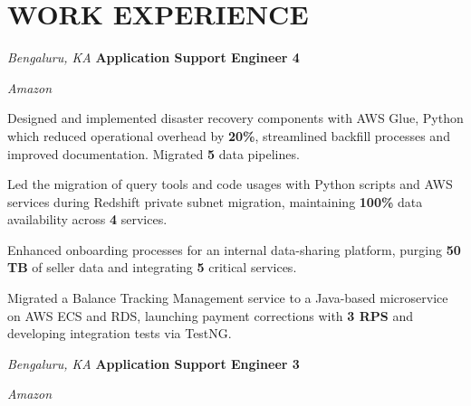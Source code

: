 \section{WORK EXPERIENCE}

\begin{twocolentry}{
    \textit{Bengaluru, KA}}
    \textbf{Application Support Engineer 4}
    
    \textit{Amazon}
\end{twocolentry}

\vspace{0.15 cm}

\begin{onecolentry}
    \begin{highlights}
        \item Designed and implemented disaster recovery components with AWS Glue, Python which reduced operational overhead by \textbf{20\%}, streamlined backfill processes and improved documentation. Migrated \textbf{5} data pipelines.
        \item Led the migration of query tools and code usages with Python scripts and AWS services during Redshift private subnet migration, maintaining \textbf{100\%} data availability across \textbf{4} services.
        \item Enhanced onboarding processes for an internal data-sharing platform, purging \textbf{50 TB} of seller data and integrating \textbf{5} critical services.
        \item Migrated a Balance Tracking Management service to a Java-based microservice on AWS ECS and RDS, launching payment corrections with \textbf{3 RPS} and developing integration tests via TestNG.
    \end{highlights}
\end{onecolentry}

\vspace{0.15 cm}

\begin{twocolentry}{
    \textit{Bengaluru, KA}}
    \textbf{Application Support Engineer 3}
    
    \textit{Amazon}
\end{twocolentry}

\vspace{0.15 cm}

